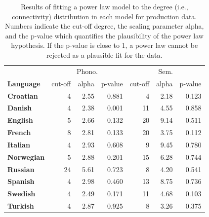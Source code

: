 \documentclass[english,,man,floatsintext]{apa6}
\begin{document}
\begin{table}

\caption{\label{tab:powerLawProd}Results of fitting a power law model to the degree (i.e., connectivity) distribution in each model for production data. Numbers indicate the cut-off degree, the scaling parameter alpha, and the p-value which quantifies the plausibility of the power law hypothesis. If the p-value is close to 1, a power law cannot be rejected as a plausible fit for the data.}
\centering
\begin{tabular}[t]{>{\bfseries}lrrrrrr}
\toprule
\multicolumn{1}{c}{} & \multicolumn{3}{c}{Phono.} & \multicolumn{3}{c}{Sem.} \\
\cmidrule(l{3pt}r{3pt}){2-4} \cmidrule(l{3pt}r{3pt}){5-7}
Language & cut-off & alpha & p-value & cut-off & alpha & p-value\\
\midrule
Croatian & 4 & 2.55 & 0.881 & 4 & 2.18 & 0.123\\
Danish & 4 & 2.38 & 0.001 & 11 & 4.55 & 0.858\\
English & 5 & 2.66 & 0.132 & 20 & 9.14 & 0.511\\
French & 8 & 2.81 & 0.133 & 20 & 3.75 & 0.112\\
Italian & 4 & 2.93 & 0.608 & 9 & 9.45 & 0.780\\
Norwegian & 5 & 2.88 & 0.201 & 15 & 6.28 & 0.744\\
Russian & 24 & 5.61 & 0.723 & 8 & 4.20 & 0.541\\
Spanish & 4 & 2.98 & 0.460 & 13 & 8.75 & 0.736\\
Swedish & 4 & 2.49 & 0.171 & 11 & 4.68 & 0.103\\
Turkish & 4 & 2.87 & 0.925 & 8 & 3.26 & 0.375\\
\bottomrule
\end{tabular}
\end{table}
\end{document}
